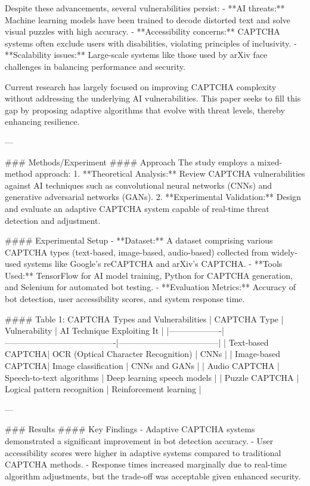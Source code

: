 Despite these advancements, several vulnerabilities persist:
- **AI threats:** Machine learning models have been trained to decode distorted text and solve visual puzzles with high accuracy.
- **Accessibility concerns:** CAPTCHA systems often exclude users with disabilities, violating principles of inclusivity.
- **Scalability issues:** Large-scale systems like those used by arXiv face challenges in balancing performance and security.

Current research has largely focused on improving CAPTCHA complexity without addressing the underlying AI vulnerabilities. This paper seeks to fill this gap by proposing adaptive algorithms that evolve with threat levels, thereby enhancing resilience.

---

### Methods/Experiment
#### Approach
The study employs a mixed-method approach:
1. **Theoretical Analysis:** Review CAPTCHA vulnerabilities against AI techniques such as convolutional neural networks (CNNs) and generative adversarial networks (GANs).
2. **Experimental Validation:** Design and evaluate an adaptive CAPTCHA system capable of real-time threat detection and adjustment.

#### Experimental Setup
- **Dataset:** A dataset comprising various CAPTCHA types (text-based, image-based, audio-based) collected from widely-used systems like Google's reCAPTCHA and arXiv's CAPTCHA.
- **Tools Used:** TensorFlow for AI model training, Python for CAPTCHA generation, and Selenium for automated bot testing.
- **Evaluation Metrics:** Accuracy of bot detection, user accessibility scores, and system response time.

#### Table 1: CAPTCHA Types and Vulnerabilities
| CAPTCHA Type      | Vulnerability                          | AI Technique Exploiting It        |
|-------------------|----------------------------------------|------------------------------------|
| Text-based CAPTCHA| OCR (Optical Character Recognition)    | CNNs                               |
| Image-based CAPTCHA| Image classification                  | CNNs and GANs                     |
| Audio CAPTCHA     | Speech-to-text algorithms              | Deep learning speech models       |
| Puzzle CAPTCHA    | Logical pattern recognition            | Reinforcement learning            |

---

### Results
#### Key Findings
- Adaptive CAPTCHA systems demonstrated a significant improvement in bot detection accuracy.
- User accessibility scores were higher in adaptive systems compared to traditional CAPTCHA methods.
- Response times increased marginally due to real-time algorithm adjustments, but the trade-off was acceptable given enhanced security.

